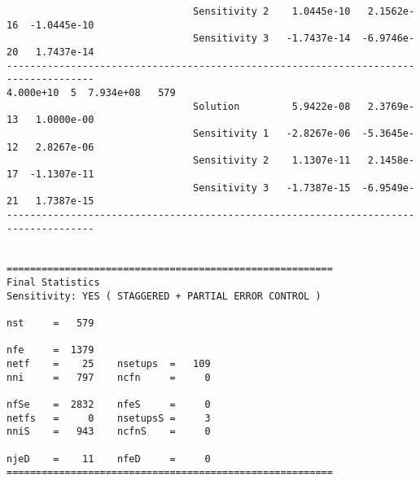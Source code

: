 \begin{verbatim}
                                Sensitivity 2    1.0445e-10   2.1562e-16  -1.0445e-10 
                                Sensitivity 3   -1.7437e-14  -6.9746e-20   1.7437e-14 
-------------------------------------------------------------------------------------
4.000e+10  5  7.934e+08   579
                                Solution         5.9422e-08   2.3769e-13   1.0000e-00 
                                Sensitivity 1   -2.8267e-06  -5.3645e-12   2.8267e-06 
                                Sensitivity 2    1.1307e-11   2.1458e-17  -1.1307e-11 
                                Sensitivity 3   -1.7387e-15  -6.9549e-21   1.7387e-15 
-------------------------------------------------------------------------------------


========================================================
Final Statistics
Sensitivity: YES ( STAGGERED + PARTIAL ERROR CONTROL )

nst     =   579

nfe     =  1379
netf    =    25    nsetups  =   109
nni     =   797    ncfn     =     0

nfSe    =  2832    nfeS     =     0
netfs   =     0    nsetupsS =     3
nniS    =   943    ncfnS    =     0

njeD    =    11    nfeD     =     0
========================================================
\end{verbatim}